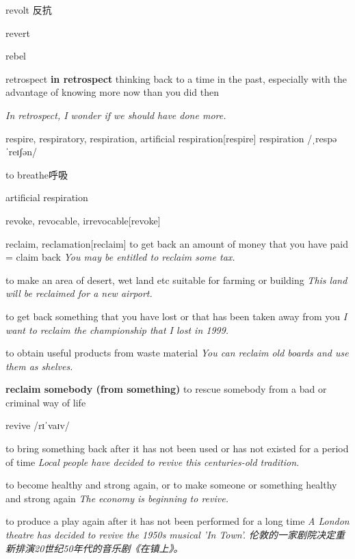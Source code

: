 \begin{DefWord}{revolt}
    反抗
\end{DefWord}

\begin{DefWord}{revert}
\end{DefWord}

\begin{DefWord}{rebel}
\end{DefWord}

\begin{DefWord}{retrospect}
    \textbf{in retrospect} thinking back to a time in the past, especially with the advantage of knowing more now than you did then

    \textit{In retrospect, I wonder if we should have done more.}
\end{DefWord}

\begin{DefWord}{respire, respiratory, respiration, artificial respiration}[respire]
    respiration /ˌrespəˈreɪʃən/ 

    to breathe呼吸

    artificial respiration
\end{DefWord}

\begin{DefWord}{revoke, revocable, irrevocable}[revoke]
\end{DefWord}

\begin{DefWord}{reclaim, reclamation}[reclaim]
    to get back an amount of money that you have paid = claim back
    \textit{You may be entitled to reclaim some tax.}

    to make an area of desert, wet land etc suitable for farming or building
    \textit{This land will be reclaimed for a new airport.}

    to get back something that you have lost or that has been taken away from you
    \textit{I want to reclaim the championship that I lost in 1999.}

    to obtain useful products from waste material
    \textit{You can reclaim old boards and use them as shelves.}

    \textbf{reclaim somebody (from something)} to rescue somebody from a bad or criminal way of life
\end{DefWord}

\begin{DefWord}{revive}
    /rɪˈvaɪv/

    to bring something back after it has not been used or has not existed for a period of time
    \textit{Local people have decided to revive this centuries-old tradition.}

    to become healthy and strong again, or to make someone or something healthy and strong again
    \textit{The economy is beginning to revive.}

    to produce a play again after it has not been performed for a long time
    \textit{A London theatre has decided to revive the 1950s musical 'In Town'. 伦敦的一家剧院决定重新排演20世纪50年代的音乐剧《在镇上》。 }
\end{DefWord}

